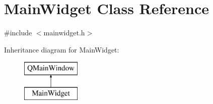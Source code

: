 \hypertarget{class_main_widget}{}\section{Main\+Widget Class Reference}
\label{class_main_widget}


{\ttfamily \#include $<$mainwidget.\+h$>$}

Inheritance diagram for Main\+Widget\+:\begin{figure}[H]
\begin{center}
\leavevmode
\includegraphics[height=2.000000cm]{class_main_widget}
\end{center}
\end{figure}
